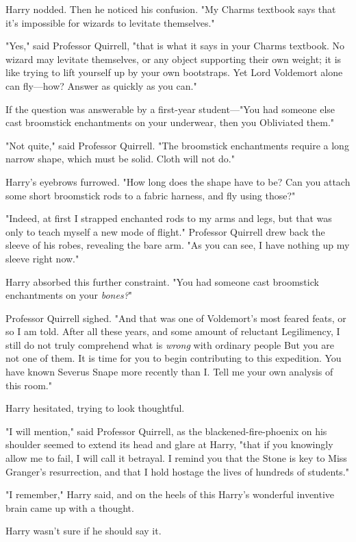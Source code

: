 Harry nodded. Then he noticed his confusion. "My Charms textbook says that it's
impossible for wizards to levitate themselves."

"Yes," said Professor Quirrell, "that is what it says in your Charms textbook.
No wizard may levitate themselves, or any object supporting their own weight;
it is like trying to lift yourself up by your own bootstraps. Yet Lord
Voldemort alone can fly---how? Answer as quickly as you can."

If the question was answerable by a first-year student---"You had someone else
cast broomstick enchantments on your underwear, then you Obliviated them."

"Not quite," said Professor Quirrell. "The broomstick enchantments require a
long narrow shape, which must be solid. Cloth will not do."

Harry's eyebrows furrowed. "How long does the shape have to be? Can you attach
some short broomstick rods to a fabric harness, and fly using those?"

"Indeed, at first I strapped enchanted rods to my arms and legs, but that was
only to teach myself a new mode of flight." Professor Quirrell drew back the
sleeve of his robes, revealing the bare arm. "As you can see, I have nothing up
my sleeve right now."

Harry absorbed this further constraint. "You had someone cast broomstick
enchantments on your \emph{bones?}"

Professor Quirrell sighed. "And that was one of Voldemort's most feared feats,
or so I am told. After all these years, and some amount of reluctant
Legilimency, I still do not truly comprehend what is \emph{wrong} with ordinary
people{\el} But you are not one of them. It is time for you to begin
contributing to this expedition. You have known Severus Snape more recently
than I. Tell me your own analysis of this room."

Harry hesitated, trying to look thoughtful.

"I will mention," said Professor Quirrell, as the blackened-fire-phoenix on his
shoulder seemed to extend its head and glare at Harry, "that if you knowingly
allow me to fail, I will call it betrayal. I remind you that the Stone is key
to Miss Granger's resurrection, and that I hold hostage the lives of hundreds
of students."

"I remember," Harry said, and on the heels of this Harry's wonderful inventive
brain came up with a thought.

Harry wasn't sure if he should say it.

